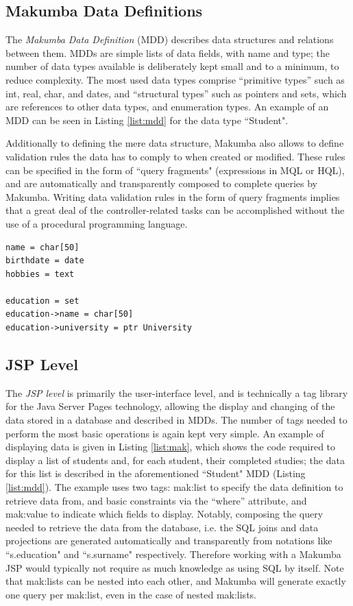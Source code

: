 \documentclass{llncs}
\begin{document}
\subsection{Makumba Data Definitions}
The \textit{Makumba Data Definition} (MDD) describes data structures and relations between them. MDDs are simple lists of data fields, with name and type; the number of data types available is deliberately kept small and to a minimum, to reduce complexity. The most used data types comprise ``primitive types'' such as int, real, char, and dates, and ``structural types'' such as pointers and sets, which are references to other data types, and enumeration types. An example of an MDD can be seen in Listing \ref{list:mdd} for the data type ``Student".

Additionally to defining the mere data structure, Makumba also allows to define validation rules the data has to comply to when created or modified. These rules can be specified in the form of ``query fragments" (expressions in MQL or HQL), and are automatically and transparently composed to complete queries by Makumba. Writing data validation rules in the form of query fragments implies that a great deal of the controller-related tasks can be accomplished without the use of a procedural programming language.

\lstset{basicstyle=\small, captionpos=b, caption=Makumba Data Definition "Student", label=list:mdd, frame=shadowbox}
\begin{lstlisting}
name = char[50]
birthdate = date
hobbies = text

education = set
education->name = char[50]
education->university = ptr University
\end{lstlisting}

\subsection{JSP Level}
The \textit{JSP level} is primarily the user-interface level, and is technically a tag library for the Java Server Pages technology, allowing the display and changing of the data stored in a database and described in MDDs. The number of tags needed to perform the most basic operations is again kept very simple. An example of displaying data is given in Listing \ref{list:mak}, which shows the code required to display a list of students and, for each student, their completed studies; the data for this list is described in the aforementioned ``Student" MDD (Listing \ref{list:mdd}). The example uses two tags: mak:list to specify the data definition to retrieve data from, and basic constraints via the ``where'' attribute, and mak:value to indicate which fields to display. Notably, composing the query needed to retrieve the data from the database, i.e. the SQL joins and data projections are generated automatically and transparently from notations like ``s.education" and ``s.surname" respectively. Therefore working with a Makumba JSP would typically not require as much knowledge as using SQL by itself. Note that mak:lists can be nested into each other, and Makumba will generate exactly one query per mak:list, even in the case of nested mak:lists.
\end{document}
